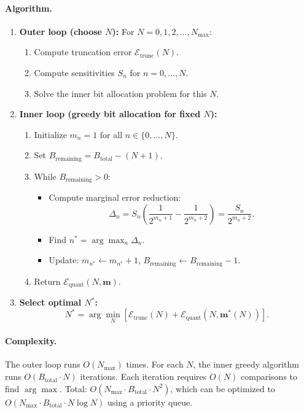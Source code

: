 \paragraph{Algorithm.}
\begin{enumerate}
\item \textbf{Outer loop (choose $N$):} For $N = 0, 1, 2, \ldots, N_{\max}$:
\begin{enumerate}
\item Compute truncation error $\mathcal{E}_{\text{trunc}}(N)$.
\item Compute sensitivities $S_n$ for $n = 0, \ldots, N$.
\item Solve the inner bit allocation problem for this $N$.
\end{enumerate}
\item \textbf{Inner loop (greedy bit allocation for fixed $N$):}
\begin{enumerate}
\item Initialize $m_n = 1$ for all $n \in \{0, \ldots, N\}$.
\item Set $B_{\text{remaining}} = B_{\text{total}} - (N+1)$.
\item While $B_{\text{remaining}} > 0$:
\begin{itemize}
\item Compute marginal error reduction:
\[
\Delta_n = S_n \left(\frac{1}{2^{m_n+1}} - \frac{1}{2^{m_n+2}}\right) = \frac{S_n}{2^{m_n+2}}.
\]
\item Find $n^* = \arg\max_n \Delta_n$.
\item Update: $m_{n^*} \gets m_{n^*} + 1$, $B_{\text{remaining}} \gets B_{\text{remaining}} - 1$.
\end{itemize}
\item Return $\mathcal{E}_{\text{quant}}(N, \mathbf{m})$.
\end{enumerate}
\item \textbf{Select optimal $N^*$:}
\[
N^* = \arg\min_{N} \left[\mathcal{E}_{\text{trunc}}(N) + \mathcal{E}_{\text{quant}}(N, \mathbf{m}^*(N))\right].
\]
\end{enumerate}

\paragraph{Complexity.} The outer loop runs $O(N_{\max})$ times. For each $N$, the inner greedy algorithm runs $O(B_{\text{total}} \cdot N)$ iterations. Each iteration requires $O(N)$ comparisons to find $\arg\max$. Total: $O(N_{\max} \cdot B_{\text{total}} \cdot N^2)$, which can be optimized to $O(N_{\max} \cdot B_{\text{total}} \cdot N \log N)$ using a priority queue.

